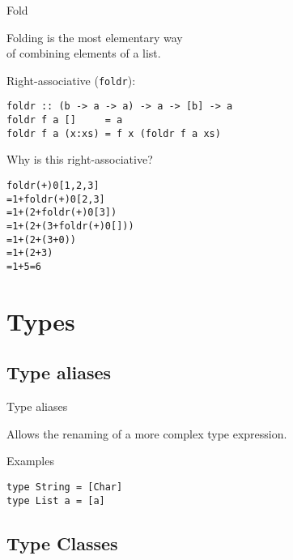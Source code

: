 \documentclass{beamer}
\def\code#1{\texttt{\frenchspacing#1}}
\begin{document}
\begin{frame}[fragile]{Fold}

\begin{block}{\centering Folding is the most elementary way \\ of combining elements of a list.}
\end{block}

Right-associative (\code{foldr}):

\begin{verbatim}
foldr :: (b -> a -> a) -> a -> [b] -> a
foldr f a []     = a
foldr f a (x:xs) = f x (foldr f a xs)
\end{verbatim}

\pause

Why is this right-associative?

\pause

\begin{alltt}
foldr (+) 0 [1,2,3]\pause
= 1 + foldr (+) 0 [2,3]\pause
= 1 + (2 + foldr (+) 0 [3])\pause
= 1 + (2 + (3 + foldr (+) 0 []))\pause
= 1 + (2 + (3 + 0))\pause
= 1 + (2 + 3)\pause
= 1 + 5 = 6
\end{alltt}

\end{frame}

\section{Types}

\subsection{Type aliases}

\begin{frame}[fragile]{Type aliases}

Allows the renaming of a more complex type expression.

\begin{exampleblock}{Examples}
\begin{verbatim}
type String = [Char]
type List a = [a]
\end{verbatim}
\end{exampleblock}

\end{frame}

\subsection{Type Classes}
\end{document}
